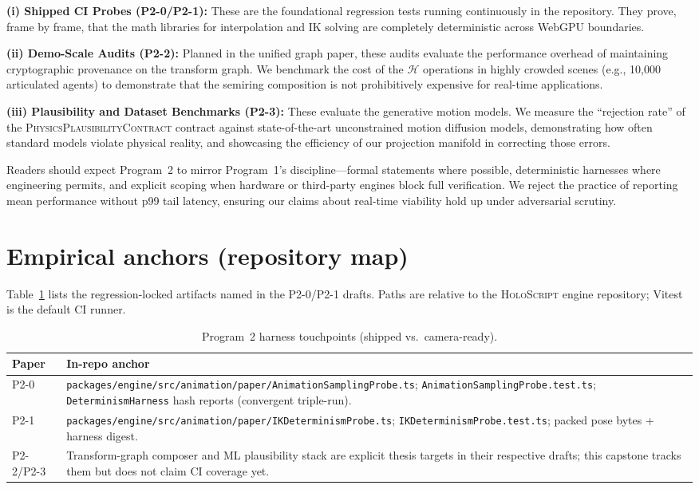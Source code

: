 \documentclass[sigconf,nonacm]{acmart}
\newcommand{\holoscript}{\textsc{HoloScript}}
\newcommand{\plausibility}{\textsc{PhysicsPlausibilityContract}}
\newcommand{\hashfn}{\mathcal{H}}
\begin{document}
\textbf{(i) Shipped CI Probes (P2-0/P2-1):} These are the foundational regression tests running continuously in the repository. They prove, frame by frame, that the math libraries for interpolation and IK solving are completely deterministic across WebGPU boundaries.

\textbf{(ii) Demo-Scale Audits (P2-2):} Planned in the unified graph paper, these audits evaluate the performance overhead of maintaining cryptographic provenance on the transform graph. We benchmark the cost of the $\hashfn$ operations in highly crowded scenes (e.g., 10,000 articulated agents) to demonstrate that the semiring composition is not prohibitively expensive for real-time applications.

\textbf{(iii) Plausibility and Dataset Benchmarks (P2-3):} These evaluate the generative motion models. We measure the ``rejection rate'' of the \plausibility{} contract against state-of-the-art unconstrained motion diffusion models, demonstrating how often standard models violate physical reality, and showcasing the efficiency of our projection manifold in correcting those errors.

Readers should expect Program~2 to mirror Program~1's discipline---formal statements where possible, deterministic harnesses where engineering permits, and explicit scoping when hardware or third-party engines block full verification. We reject the practice of reporting mean performance without p99 tail latency, ensuring our claims about real-time viability hold up under adversarial scrutiny.
\section{Empirical anchors (repository map)}

Table~\ref{tab:p2-harnesses} lists the regression-locked artifacts named
in the P2-0/P2-1 drafts. Paths are relative to the \holoscript{} engine
repository; Vitest is the default CI runner.

\begin{table}[t]
  \centering
  \caption{Program~2 harness touchpoints (shipped vs.\ camera-ready).}
  \label{tab:p2-harnesses}
  \small
  \begin{tabular}{@{}p{2.1cm}p{5.7cm}@{}}
    \toprule
    \textbf{Paper} & \textbf{In-repo anchor} \\
    \midrule
    P2-0 &
      \texttt{packages/engine/src/animation/paper/AnimationSamplingProbe.ts};
      \texttt{AnimationSamplingProbe.test.ts};
      \texttt{DeterminismHarness} hash reports (convergent triple-run). \\
    P2-1 &
      \texttt{packages/engine/src/animation/paper/IKDeterminismProbe.ts};
      \texttt{IKDeterminismProbe.test.ts};
      packed pose bytes + harness digest. \\
    P2-2/P2-3 &
      Transform-graph composer and ML plausibility stack are explicit
      thesis targets in their respective drafts; this capstone tracks
      them but does not claim CI coverage yet. \\
    \bottomrule
  \end{tabular}
\end{table}
\end{document}
